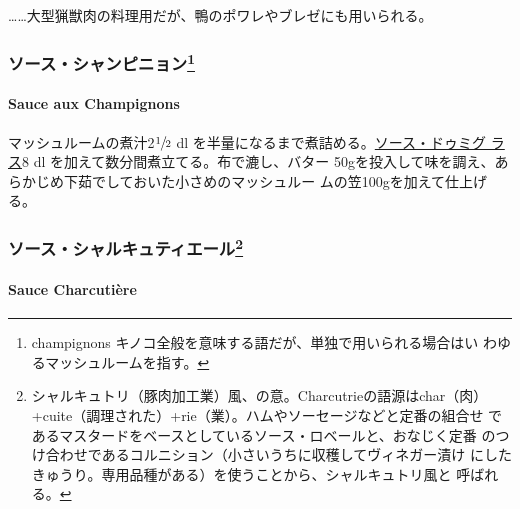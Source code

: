 \documentclass[twoside,12Q,b5j]{escoffierltjsbook}
\newenvironment{recette}{\begin{small}\begin{spacing}{1}\begin{multicols}{2}}{\end{multicols}\end{spacing}\end{small}}
\begin{document}
\begin{recette}
\ldots{}\ldots{}大型猟獣肉の料理用だが、鴨のポワレやブレゼにも用いられる。

\vspace*{1.7\zw}

\subsubsection[ソース・シャンピニョン]{\texorpdfstring{ソース・シャンピニョン\footnote{champignons
  キノコ全般を意味する語だが、単独で用いられる場合はい
  わゆるマッシュルームを指す。}}{ソース・シャンピニョン}}\label{ux30bdux30fcux30b9ux30b7ux30e3ux30f3ux30d4ux30cbux30e7ux30f37}

\paragraph{Sauce aux Champignons}\label{sauce-aux-champignons}


マッシュルームの煮汁2\(\sfrac{1}{2}\) dl
を半量になるまで煮詰める。\protect\hyperlink{sauce-demi-glace}{ソース・ドゥミグ
ラス}8 dl を加えて数分間煮立てる。布で漉し、バター
50gを投入して味を調え、あらかじめ下茹でしておいた小さめのマッシュルー
ムの笠100gを加えて仕上げる。

\vspace*{1.7\zw}

\subsubsection[ソース・シャルキュティエール]{\texorpdfstring{ソース・シャルキュティエール\footnote{シャルキュトリ（豚肉加工業）風、の意。Charcutrieの語源はchar（肉）
  +cuite（調理された）+rie（業）。ハムやソーセージなどと定番の組合せ
  であるマスタードをベースとしているソース・ロベールと、おなじく定番
  のつけ合わせであるコルニション（小さいうちに収穫してヴィネガー漬け
  にしたきゅうり。専用品種がある）を使うことから、シャルキュトリ風と
  呼ばれる。}}{ソース・シャルキュティエール}}\label{ux30bdux30fcux30b9ux30b7ux30e3ux30ebux30adux30e5ux30c6ux30a3ux30a8ux30fcux30eb8}

\paragraph{Sauce Charcutière}\label{sauce-charcutiere}


\end{recette}
\end{document}
